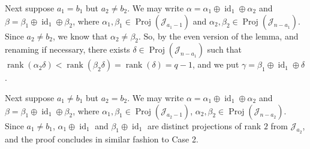 \documentclass[11pt,a4paper]{article}
\newcommand{\J}{\mathcal J}
\newcommand{\al}{\alpha}
\newcommand{\be}{\beta}
\newcommand{\ga}{\gamma}
\newcommand{\de}{\delta}
\newcommand{\Proj}{\operatorname{Proj}}
\newcommand{\rank}{\operatorname{rank}}
\newcommand{\id}{\operatorname{id}}
\newcommand{\1}{\id_n}
\numberwithin{equation}{section}
\theoremstyle{definition}
\begin{document}
\begin{itemize}
\begin{itemize}
\begin{itemize}
\begin{itemize}
\begin{itemize}
\begin{itemize}
\begin{itemize}
\begin{itemize}
\begin{itemize}
\begin{itemize}
\begin{itemize}
\begin{itemize}
\bigskip{}  Next suppose $a_1=b_1$ but $a_2\not=b_2$.  We may write $\al=\al_1\oplus\id_1\oplus\al_2$ and $\be=\be_1\oplus\id_1\oplus\be_2$, where $\al_1,\be_1\in\Proj(\J_{a_1-1})$ and $\al_2,\be_2\in\Proj(\J_{n-a_1})$.  Since $a_2\not=b_2$, we know that $\al_2\not=\be_2$.  So, by the even version of the lemma, and renaming if necessary, there exists $\de\in\Proj(\J_{n-a_1})$ such that $\rank(\al_2\de)<\rank(\be_2\de)=\rank(\de)=q-1$, and we put $\ga=\be_1\oplus\id_1\oplus\de$.



\bigskip{} Next suppose $a_1\not=b_1$ but $a_2=b_2$.  We may write $\al=\al_1\oplus\id_1\oplus\al_2$ and $\be=\be_1\oplus\id_1\oplus\be_2$, where $\al_1,\be_1\in\Proj(\J_{a_2-1})$, $\al_2,\be_2\in\Proj(\J_{n-a_2})$.  Since $a_1\not=b_1$, $\al_1\oplus\id_1$ and $\be_1\oplus\id_1$ are distinct projections of rank $2$ from $\J_{a_2}$, and the proof concludes in similar fashion to Case 2.






\end{itemize}
\end{itemize}
\end{itemize}
\end{itemize}
\end{itemize}
\end{itemize}
\end{itemize}
\end{itemize}
\end{itemize}
\end{itemize}
\end{itemize}
\end{itemize}
\end{document}
